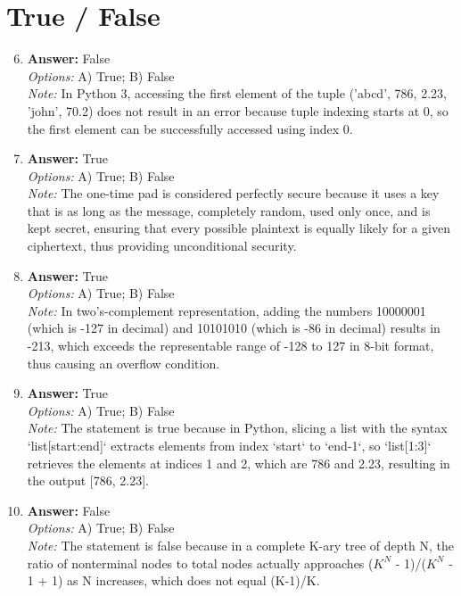 \documentclass[12pt]{article}
\begin{document}
\section*{True / False}
\begin{enumerate}[label=\arabic*.]
\setcounter{enumi}{5}
\item \textbf{Answer:} False
\\ \textit{Options:} A) True; B) False
\\ \textit{Note:} In Python 3, accessing the first element of the tuple ('abcd', 786, 2.23, 'john', 70.2) does not result in an error because tuple indexing starts at 0, so the first element can be successfully accessed using index 0.
\item \textbf{Answer:} True
\\ \textit{Options:} A) True; B) False
\\ \textit{Note:} The one-time pad is considered perfectly secure because it uses a key that is as long as the message, completely random, used only once, and is kept secret, ensuring that every possible plaintext is equally likely for a given ciphertext, thus providing unconditional security.
\item \textbf{Answer:} True
\\ \textit{Options:} A) True; B) False
\\ \textit{Note:} In two's-complement representation, adding the numbers 10000001 (which is -127 in decimal) and 10101010 (which is -86 in decimal) results in -213, which exceeds the representable range of -128 to 127 in 8-bit format, thus causing an overflow condition.
\item \textbf{Answer:} True
\\ \textit{Options:} A) True; B) False
\\ \textit{Note:} The statement is true because in Python, slicing a list with the syntax `list[start:end]` extracts elements from index `start` to `end-1`, so `list[1:3]` retrieves the elements at indices 1 and 2, which are 786 and 2.23, resulting in the output [786, 2.23].
\item \textbf{Answer:} False
\\ \textit{Options:} A) True; B) False
\\ \textit{Note:} The statement is false because in a complete K-ary tree of depth N, the ratio of nonterminal nodes to total nodes actually approaches ($K^N$ - 1)/($K^N$ - 1 + 1) as N increases, which does not equal (K-1)/K.
\end{enumerate}
\end{document}
